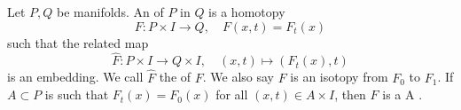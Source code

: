 Let $P, Q$ be manifolds. An  of $P$ in $Q$ is a homotopy
$$F: P \times I \rightarrow Q, \quad F(x,t) = F_t(x)$$
such that the related map
$$\hat{F}: P \times I \rightarrow Q \times I, \quad (x,t) \mapsto (F_t(x),t)$$
is an embedding. We call $\hat{F}$ the  of $F$. We also say $F$ is an isotopy from $F_0$ to $F_1$. If $A \subset P$ is such that $F_t(x) = F_0(x)$ for all $(x,t) \in A \times I$, then $F$ is a  A .
